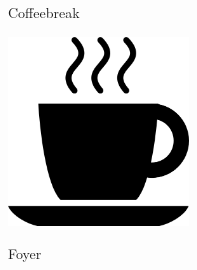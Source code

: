 \documentclass[a4paper]{article}
\begin{document}
\printVSLEventHeader{}{}
\begin{center}
    \vspace{-2cm}
\begin{vsltext}{3cm}{4cm}
    Coffeebreak

    \vspace{0.5cm}

    \includegraphics[height=5cm, keepaspectratio=true]{coffeecup.png}

    \vspace{0.5cm}

    Foyer

\end{vsltext}

\end{center}
\end{document}
